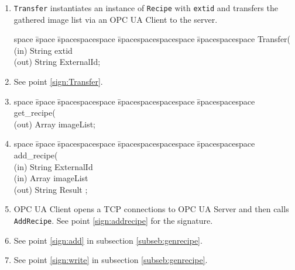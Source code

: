 \begin{enumerate}
    \item \texttt{Transfer} instantiates an instance of \texttt{Recipe} with \texttt{extid} and transfers the gathered image list via an OPC UA Client to the server.
    \begin{tabbing}
    space \= space \= spacespacespace \= spacespacespacespace \= spacespacespace \kill
    \>  Transfer(\\
    \>  \>  (in)	 \> 	String          \> extid\\
    \>  \>  (out)	 \> 	String          \> ExternalId; 
    \end{tabbing} \label{sign:Transfer}
    \item See point \ref{sign:Transfer}.
    \item 
    \begin{tabbing}
    space \= space \= spacespacespace \= spacespacespacespace \= spacespacespace \kill
    \>  get\_recipe(\\
    \>  \>  (out)	 \> 	Array          \> imageList; 
    \end{tabbing}
    \item 
    \begin{tabbing}
    space \= space \= spacespacespace \= spacespacespacespace \= spacespacespace \kill
    \>  add\_recipe(\\
    \>  \>  (in)	 \> 	String          \> ExternalId\\
    \>  \>  (in)	 \> 	Array          \> imageList\\
    \>  \>  (out)	 \> 	String          \> Result ; 
    \end{tabbing}\label{sign:addrecipe}
    \item OPC UA Client opens a TCP connections to OPC UA Server and then calls \texttt{AddRecipe}. See point \ref{sign:addrecipe} for the signature.
    \item See point \ref{sign:add} in subsection \ref{subseb:genrecipe}.
    \item See point \ref{sign:write} in subsection \ref{subseb:genrecipe}.
\end{enumerate}

